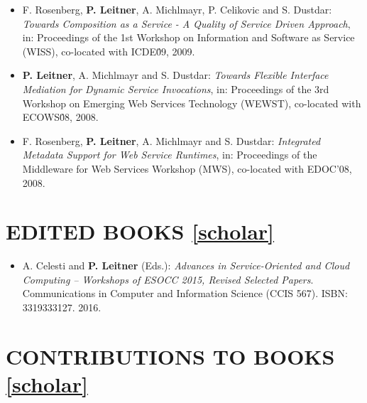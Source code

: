\documentclass[paper=letter,fontsize=11pt]{scrartcl} %
\newcommand{\NewPart}[2]{\section*{\uppercase{#1} #2}}
\begin{document}
\begin{itemize}
\item F. Rosenberg, \textbf{P. Leitner}, A. Michlmayr, P. Celikovic and S. Dustdar: \emph{Towards Composition as a Service - A Quality of Service Driven Approach}, in: Proceedings of the 1st Workshop on Information and Software as Service (WISS), co-located with ICDE\'09, 2009. 
\item \textbf{P. Leitner}, A. Michlmayr and S. Dustdar: \emph{Towards Flexible Interface Mediation for Dynamic Service Invocations}, in: Proceedings of the 3rd Workshop on Emerging Web Services Technology (WEWST), co-located with ECOWS\'08, 2008. 
\item F. Rosenberg, \textbf{P. Leitner}, A. Michlmayr and S. Dustdar: \emph{Integrated Metadata Support for Web Service Runtimes}, in: Proceedings of the Middleware for Web Services Workshop (MWS), co-located with EDOC'08, 2008. 
\end{itemize}

\NewPart{Edited Books}{\href{https://scholar.google.ch/citations?user=wZ9f8CAAAAAJ}{[scholar]}}

\begin{itemize}
	\item A. Celesti and \textbf{P. Leitner} (Eds.): \emph{Advances in
  Service-Oriented and Cloud Computing -- Workshops of ESOCC 2015, Revised Selected Papers}.
Communications in Computer and Information Science (CCIS 567). ISBN: 3319333127. 2016.

\end{itemize}

\NewPart{Contributions to Books}{\href{https://scholar.google.ch/citations?user=wZ9f8CAAAAAJ}{[scholar]}}
\end{document}
